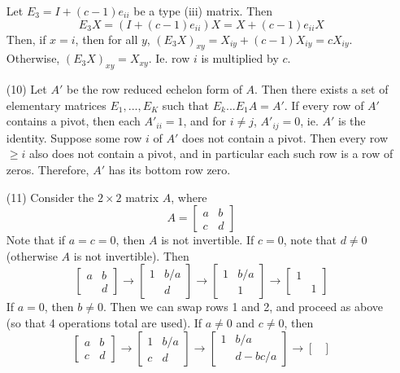 \documentclass[12pt]{article}
\begin{document}
\begin{itemize}
Let $E_3 = I + (c - 1)e_{ii}$ be a type (iii) matrix. Then
$$E_3X = (I + (c - 1)e_{ii})X = X + (c-1)e_{ii}X$$
Then, if $x = i$, then for all $y$, $(E_3X)_{xy} = X_{iy} + (c-1)X_{iy} = cX_{iy}$. Otherwise, $(E_3X)_{xy} = X_{xy}$. Ie. row $i$ is multiplied by $c$.
\item[(10)]
Let $A'$ be the row reduced echelon form of $A$. Then there exists a set of elementary matrices $E_1, ..., E_K$ such that $E_k...E_1A = A'$. If every row of $A'$ contains a pivot, then each $A'_{ii} = 1$, and  for $ i \neq j$, $A'_{ij} = 0$, ie. $A'$ is the identity. Suppose some row $i$ of $A'$ does not contain a pivot. Then every row $\geq i$ also does not contain a pivot, and in particular each such row is a row of zeros. Therefore, $A'$ has its bottom row zero.
\item[(11)]
Consider the $2 \times 2$ matrix $A$, where
$$A = \begin{bmatrix}
a & b \\
c & d
\end{bmatrix}$$
Note that if $a = c = 0$, then $A$ is not invertible. If $c = 0$, note that $d \neq 0$ (otherwise $A$ is not invertible). Then
$$\begin{bmatrix}
a & b \\
& d
\end{bmatrix} \rightarrow \begin{bmatrix}
1 & b/a \\
& d
\end{bmatrix} \rightarrow \begin{bmatrix}
1 & b/a \\
& 1
\end{bmatrix} \rightarrow \begin{bmatrix}
1 & \\
& 1
\end{bmatrix}$$
If $a = 0$, then $b \neq 0$. Then we can swap rows 1 and 2, and proceed as above (so that 4 operations total are used). If $a \neq 0$ and $c \neq 0$, then
$$\begin{bmatrix}
a & b \\
c & d
\end{bmatrix} \rightarrow \begin{bmatrix}
1 & b/a \\
c & d
\end{bmatrix} \rightarrow \begin{bmatrix}
1 & b/a \\
& d - bc/a
\end{bmatrix} \rightarrow \begin{bmatrix}

\end{bmatrix}$$
\end{itemize}
\end{document}

